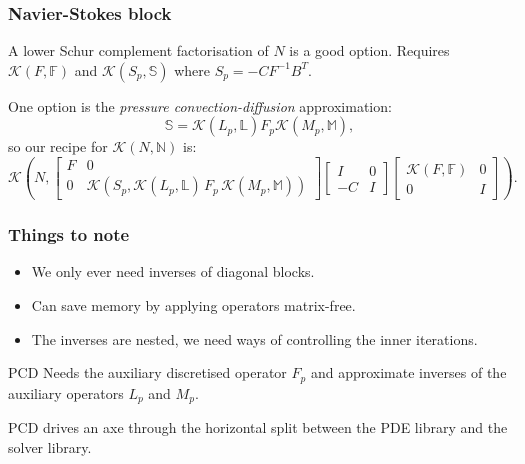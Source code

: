 \documentclass[presentation]{beamer}
\newcommand{\KSP}[2]{\ensuremath{\mathcal{K}\left(#1, \mathbb{#2}\right)}}
\newcommand{\ksp}[1]{\KSP{#1}{#1}}
\begin{document}
\begin{frame}
  \frametitle{Navier-Stokes block \parencite{Elman:2014}}
  A lower Schur complement factorisation of $N$ is a good option.
  Requires $\ksp{F}$ and $\KSP{S_p}{S}$ where $S_p = -C F^{-1} B^T$.

  One option is the \emph{pressure convection-diffusion}
  approximation:
  \begin{equation*}
    \mathbb{S} = \KSP{L_p}{L} F_p \KSP{M_p}{M},
  \end{equation*}
  so our recipe for $\ksp{N}$ is:
  \begin{equation*}
    \mathcal{K}\left(N, \begin{bmatrix}
      F & 0 \\
      0 & \mathcal{K}(S_p, \KSP{L_p}{L}\,F_p \, \KSP{M_p}{M})
    \end{bmatrix}
    \begin{bmatrix}
      I & 0\\
      -C & I
    \end{bmatrix}
    \begin{bmatrix}
      \ksp{F} & 0 \\
      0 & I
    \end{bmatrix}\right).
  \end{equation*}

\end{frame}

\begin{frame}
  \frametitle{Things to note}

  \begin{itemize}
  \item We only ever need inverses of diagonal blocks.
  \item Can save memory by applying operators matrix-free.
  \item The inverses are nested, we need ways of controlling the inner
    iterations.
  \end{itemize}

  \begin{block}{PCD}
    Needs the auxiliary discretised operator $F_p$ and approximate
    inverses of the auxiliary operators $L_p$ and $M_p$.

    PCD drives an axe through the horizontal split between
    the PDE library and the solver library.
  \end{block}
\end{frame}
\end{document}
